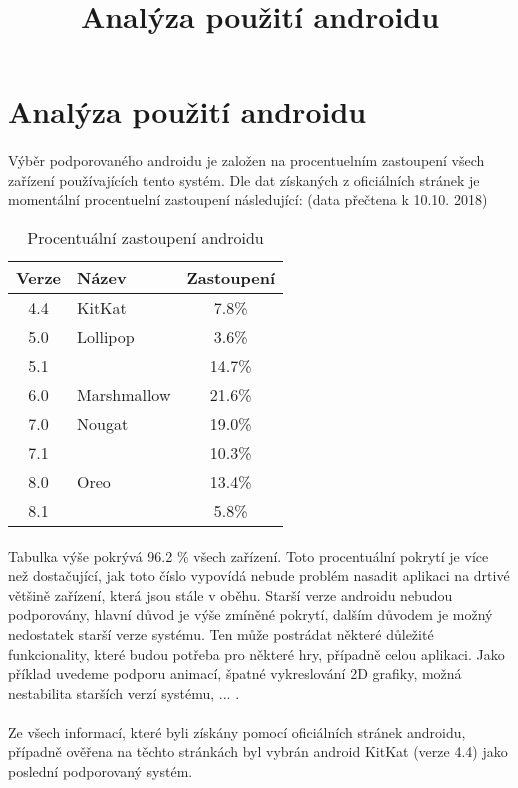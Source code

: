 \documentclass{article}
\title{Analýza použití androidu}
\author{}
\begin{document}
\maketitle
{}
\newpage
\section*{Analýza použití androidu}
\paragraph{} Výběr podporovaného androidu je založen na procentuelním zastoupení všech zařízení používajících tento systém. Dle dat získaných z oficiálních stránek je momentální procentuelní zastoupení následující:	(data přečtena k 10.10. 2018)

\begin{table}[h]
    \centering
    \renewcommand{\tablename}{Tabulka}
    \begin{tabular}{c|l|c}
        \toprule
        \textbf{Verze} & \textbf{Název} & \textbf{Zastoupení}\\
        \midrule
        4.4 & KitKat & 7.8\% \\
        5.0 & Lollipop & 3.6\% \\
        5.1 &  & 14.7\% \\
        6.0 & Marshmallow & 21.6\% \\
        7.0 & Nougat & 19.0\% \\
        7.1 &  & 10.3\% \\
        8.0 & Oreo & 13.4\% \\
        8.1 &  & 5.8\% \\
        \bottomrule
    \end{tabular}
    \caption{Procentuální zastoupení androidu}
    \label{Tabulka}
\end{table}

\paragraph{} Tabulka výše pokrývá 96.2 \% všech zařízení. Toto procentuální pokrytí je více než dostačující, jak toto číslo vypovídá nebude problém nasadit aplikaci na drtivé většině zařízení, která jsou stále v oběhu. Starší verze androidu nebudou podporovány, hlavní důvod je výše zmíněné pokrytí, dalším důvodem je možný nedostatek starší verze systému. Ten může postrádat některé důležité funkcionality, které budou potřeba pro některé hry, případně celou aplikaci. Jako příklad uvedeme podporu animací, špatné vykreslování 2D grafiky, možná nestabilita starších verzí systému, ... .

\paragraph{} Ze všech informací, které byli získány pomocí oficiálních stránek androidu, případně ověřena na těchto stránkách byl vybrán android KitKat (verze 4.4) jako poslední podporovaný systém. 
\end{document}
